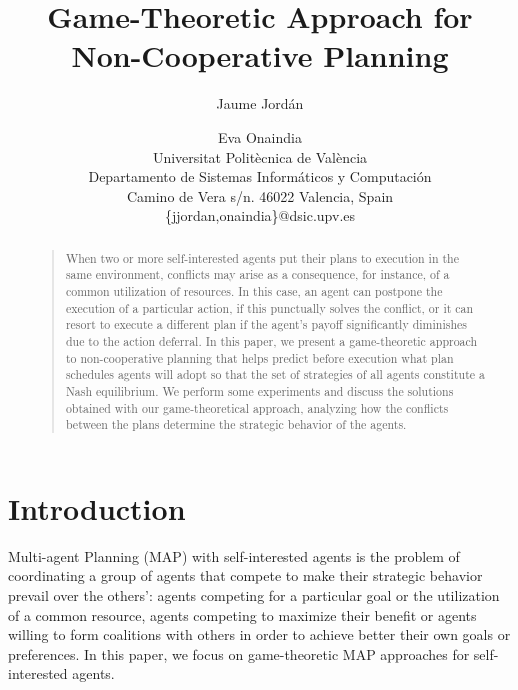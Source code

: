 \documentclass[letterpaper]{article}
\begin{document}
%
\title{Game-Theoretic Approach for Non-Cooperative Planning}
\author{ %
Jaume Jord\'{a}n \and Eva Onaindia\\
Universitat Polit\`{e}cnica de Val\`{e}ncia\\
Departamento de Sistemas Inform\'{a}ticos y Computaci\'{o}n\\
Camino de Vera s/n. 46022 Valencia, Spain\\
\{jjordan,onaindia\}@dsic.upv.es
}
\maketitle
\begin{abstract}
\begin{quote}

When two or more self-interested agents put their plans to execution in the same environment, conflicts may arise as a consequence, for instance, of a common utilization of resources. In this case, an agent can postpone the execution of a particular action, if this punctually solves the conflict, or it can resort to execute a different plan if the agent's payoff significantly diminishes due to the action deferral. In this paper, we present a game-theoretic approach to non-cooperative planning that helps predict before execution what plan schedules agents will adopt so that the set of strategies of all agents constitute a Nash equilibrium. We perform some experiments and discuss the solutions obtained with our game-theoretical approach, analyzing how the conflicts between the plans determine the strategic behavior of the agents.

\end{quote}
\end{abstract}



\section{Introduction}


Multi-agent Planning (MAP) with self-interested agents is the problem of coordinating a group of agents that compete to make their strategic behavior prevail over the others': agents competing for a particular goal or the utilization of a common resource, agents competing to maximize their benefit or agents willing to form coalitions with others in order to achieve better their own goals or preferences. In this paper, we focus on game-theoretic MAP approaches for self-interested agents.
\end{document}
